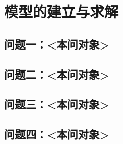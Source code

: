 \documentclass[withoutpreface]{cumcmthesis}
\begin{document}
\section{模型的建立与求解}

\subsection{问题一：<本问对象>}

\subsection{问题二：<本问对象>}


\subsection{问题三：<本问对象>}


\subsection{问题四：<本问对象>}

\end{document}
